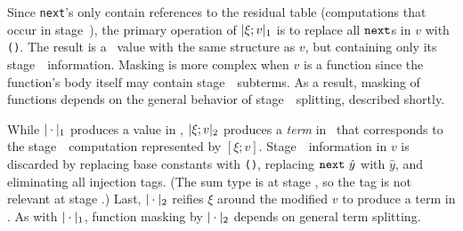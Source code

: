 Since \texttt{next}'s only contain references to the residual table (computations that occur in stage~\bbtwo),
the primary operation of $|\xi;v|_{ 1}$ is to replace all ${\tt next}$s in $v$ with \texttt{()}.   The result is a \langmono\ value with the same structure as $v$, but containing only its stage~\bbone\ information. Masking is more complex when $v$ is a function since the function's body itself may contain stage~\bbtwo\ subterms.  As a result, masking of functions depends on the general behavior of stage~\bbone\ splitting, described shortly.


While $|\cdot|_{ 1}$ produces a value in \langmono,
$|\xi;v|_{ 2}$ produces a \emph{term} in \langmono\ that corresponds to the stage~\bbtwo\ computation represented by $[\xi;v]$.
Stage~\bbone\ information in $v$ is discarded by replacing base constants with \texttt{()}, replacing ${\tt next}~\hat{y}$ with $\hat{y}$, and eliminating all injection tags. (The sum type is at stage \bbone, so the tag is not relevant at stage \bbtwo.)
Last, $|\cdot|_{ 2}$ reifies $\xi$ around the modified $v$ to produce a term in \langmono. 
As with $|\cdot|_{ 1}$, function masking by $|\cdot|_{ 2}$ depends on general term splitting.








